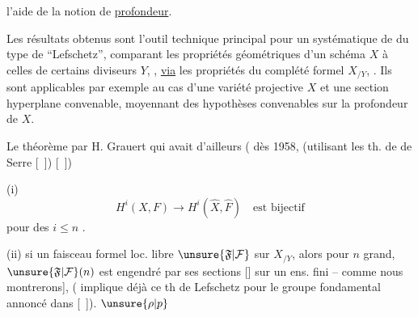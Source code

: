 
l'aide de la notion de \uline{profondeur}.

Les résultats  obtenus sont l'outil technique
principal pour un 
 systématique de
 
du type de ``Lefschetz'', comparant les propriétés géométriques
d'un schéma $X$ à celles de certains 
diviseurs $Y$, 
 ,
\uline{via} les propriétés du complété formel $X_{/Y}$, .
Ils sont applicables par exemple
au cas d'une variété projective $X$ et une section hyperplane
convenable, moyennant des hypothèses 
convenables sur la profondeur de $X$.

Le théorème 
par H. Grauert qui avait d'ailleurs
( dès 1958,
(utilisant les th. de  de Serre [\ ]) [\ ])

(i) 
\[
H^i(X,F)\longrightarrow H^i(\hat X,\hat F)
\quad\text{est bijectif}
\]
pour des  $i\leq n$
.

(ii) si un faisceau formel loc. libre
$\unsure{\mathfrak F|\mathcal F}$ sur $X_{/Y}$,
alors pour $n$ 
grand, $\unsure{\mathfrak F|\mathcal F}(n)$ est engendré
par ses sections [] sur un ens. fini --
comme nous montrerons],
( implique 
déjà ce th de Lefschetz pour le groupe fondamental annoncé dans [\ ]).
$\unsure{\rho|p}$


